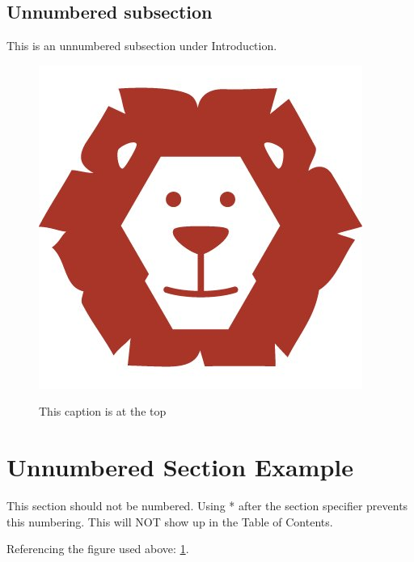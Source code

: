 \documentclass[14pt, a4paper]{article} %
\begin{document}
\pagebreak 

\subsection*{Unnumbered subsection}
This is an unnumbered subsection under Introduction. 
\begin{figure}[h]
	\centering
	\caption{This caption is at the top}
	\includegraphics[scale=0.4]{lion.jpg}
	\label{fig:1}
\end{figure}


\section*{Unnumbered Section Example}
This section should not be numbered. Using * after the section specifier prevents this numbering. This will NOT show up in the Table of Contents. 

Referencing the figure used above: \ref{fig:1}.
\end{document}

